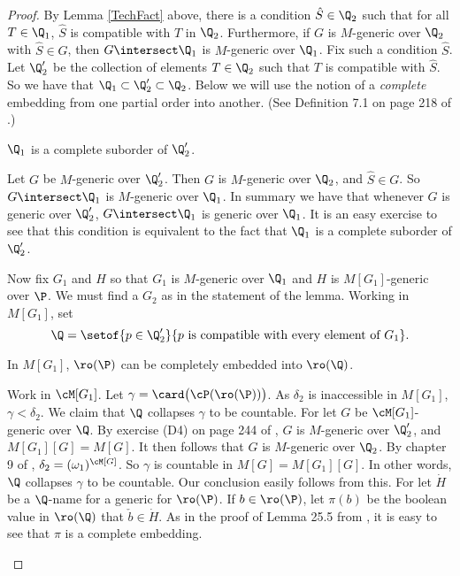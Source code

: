 \begin{proof}
By Lemma \ref{TechFact} above, there is a condition
$\hat{S}\in\Q_2$ such that
for all $T\in\Q_1$, $\hat{S}$ is compatible with $T$ in
$\Q_2$. Furthermore, if $G$ is $M$-generic over $\Q_2$ with
$\hat{S}\in G$, then
$G\intersect\Q_1$ is $M$-generic
over $\Q_1$. Fix such a condition $\hat{S}$. Let $\Q_2^{\prime}$ be the
collection of elements $T\in\Q_2$ such that $T$ is compatible
with $\hat{S}$. So we have that $\Q_1\subset\Q_2^{\prime}\subset\Q_2$.
Below we
will use the notion of a \emph{complete} embedding from one partial
order into another. (See Definition 7.1 on page 218 of \cite{Kunen_Book}.)

\begin{claim}[Claim 1]
$\Q_1$ is a complete suborder of $\Q_2^{\prime}$.
\end{claim}
\begin{subproof}
Let $G$ be $M$-generic over $\Q_2^{\prime}$. Then $G$ is $M$-generic
over $\Q_2$, and $\hat{S}\in G$. So $G\intersect\Q_1$ is $M$-generic
over $\Q_1$.  In summary we have that whenever $G$ is generic over
$\Q_2^{\prime}$, $G\intersect\Q_1$ is generic over $\Q_1$. It is an easy
exercise to see that this condition is equivalent to the fact that
$\Q_1$  is a complete suborder of $\Q_2^{\prime}$.
\end{subproof}

Now fix $G_1$ and $H$ so that $G_1$ is $M$-generic over $\Q_1$
and $H$ is $M[G_1]$-generic over $\P$. We must find a $G_2$ as in
the statement of the lemma. Working in $M[G_1]$, set
$$\Q=\setof{p\in\Q_2^{\prime}}{p \text{ is compatible with every element
of } G_1}.$$

\begin{claim}[Claim 2]
In $M[G_1]$,  $\ro(\P)$ can be completely embedded into $\ro(\Q)$.
\end{claim}
\begin{subproof}
Work in $\cM[G_1]$. Let $\gamma=\card\bigl(\cP(\ro(\P))\bigr)$.
As $\delta_2$ is inaccessible in $M[G_1]$,
 $\gamma<\delta_2$. We claim that $\Q$ collapses $\gamma$ to
be countable. For let $G$ be $\cM[G_1]$-generic over $\Q$.
By exercise (D4) on page 244 of \cite{Kunen_Book}, $G$ is
$M$-generic over $\Q_2^{\prime}$, and $M[G_1][G]=M[G]$. It then
follows that $G$ is $M$-generic over $\Q_2$. By chapter 9 of
\cite{Martin_Book}, $\delta_2=(\omega_1)^{\cM[G]}$. So $\gamma$ is
countable in $M[G]=M[G_1][G]$. In other words,  $\Q$ collapses $\gamma$ to
be countable. Our conclusion easily follows from this.
For let $\dot{H}$ be a $\Q$-name for a generic for $\ro(\P)$. If
$b\in\ro(\P)$, let $\pi(b)$ be the boolean value in $\ro(\Q)$
that $\check{b}\in\dot{H}$. As in the proof of Lemma 25.5 from
\cite{Jech_Book}, it is easy to see that $\pi$ is a complete embedding.
\end{subproof}


\end{proof}
